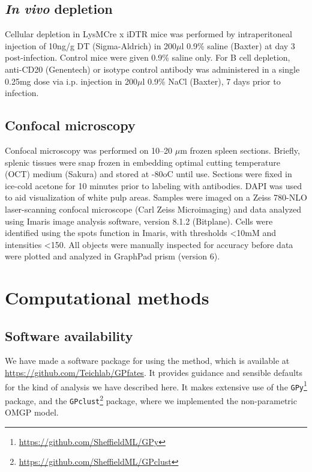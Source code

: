 \subsection{\textit{In vivo} depletion}

Cellular depletion in LysMCre x iDTR mice was performed by intraperitoneal injection of 10ng/g DT (Sigma-Aldrich) in 200\( \mu \)l 0.9\% saline (Baxter) at day 3 post-infection. Control mice were given 0.9\% saline only. For B cell depletion, anti-CD20 (Genentech) or isotype control antibody was administered in a single 0.25mg dose via i.p. injection in 200\( \mu \)l 0.9\% NaCl (Baxter), 7 days prior to infection.

\subsection{Confocal microscopy}

Confocal microscopy was performed on 10–20 \( \mu \)m frozen spleen sections. Briefly, splenic tissues were snap frozen in embedding optimal cutting temperature (OCT) medium (Sakura) and stored at -80oC until use. Sections were fixed in ice-cold acetone for 10 minutes prior to labeling with antibodies. DAPI was used to aid visualization of white pulp areas. Samples were imaged on a Zeiss 780-NLO laser-scanning confocal microscope (Carl Zeiss Microimaging) and data analyzed using Imaris image analysis software, version 8.1.2 (Bitplane). Cells were identified using the spots function in Imaris, with thresholds <10mM and intensities <150. All objects were manually inspected for accuracy before data were plotted and analyzed in GraphPad prism (version 6).

\section{Computational methods}


\subsection{Software availability}

We have made a software package for using the  method, which is available at \url{https://github.com/Teichlab/GPfates}. It provides guidance and sensible defaults for the kind of analysis we have described here. It makes extensive use of the \verb|GPy|\footnote{\url{https://github.com/SheffieldML/GPy}} package, and the \verb|GPclust|\footnote{\url{https://github.com/SheffieldML/GPclust}} package, where we implemented the non-parametric OMGP model.


